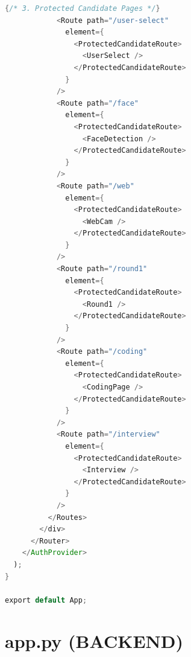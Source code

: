 \documentclass[12pt,a4paper]{report}
\begin{document}
\begin{lstlisting}[language=Java, caption={App.jsx -- React Router Configuration}]
            {/* 3. Protected Candidate Pages */}
            <Route path="/user-select"
              element={
                <ProtectedCandidateRoute>
                  <UserSelect />
                </ProtectedCandidateRoute>
              }
            />
            <Route path="/face"
              element={
                <ProtectedCandidateRoute>
                  <FaceDetection />
                </ProtectedCandidateRoute>
              }
            />
            <Route path="/web"
              element={
                <ProtectedCandidateRoute>
                  <WebCam />
                </ProtectedCandidateRoute>
              }
            />
            <Route path="/round1"
              element={
                <ProtectedCandidateRoute>
                  <Round1 />
                </ProtectedCandidateRoute>
              }
            />
            <Route path="/coding"
              element={
                <ProtectedCandidateRoute>
                  <CodingPage />
                </ProtectedCandidateRoute>
              }
            />
            <Route path="/interview"
              element={
                <ProtectedCandidateRoute>
                  <Interview />
                </ProtectedCandidateRoute>
              }
            />
          </Routes>
        </div>
      </Router>
    </AuthProvider>
  );
}

export default App;
\end{lstlisting}

\section*{app.py (BACKEND)}
\end{document}
